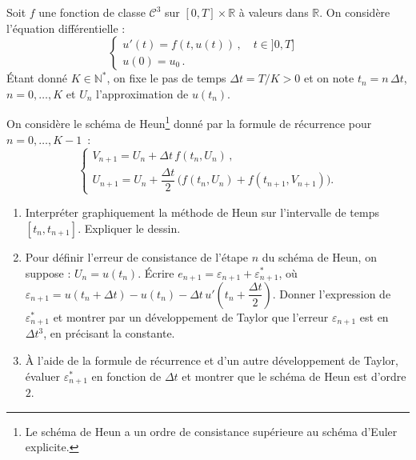 \documentclass[a4paper,12pt,reqno]{amsart}
\begin{document}
\begin{exo}

  Soit $f$ une fonction de classe ${\mathcal{C}}^3$ sur $[0,T] \times \mathbb{R}$ à valeurs dans $\mathbb{R}$. On considère l'équation différentielle :
  \begin{equation}\label{equ1}
    \begin{cases}
      u'(t)=f(t,u(t)) \,, \quad t \in ]0,T] & \\
      u(0)=u_0 \,.
    \end{cases}
  \end{equation}
  Étant donné $K \in \mathbb{N}^*$, on fixe le pas de temps $\Delta t=T/K > 0$ et on note $t_n = n\, \Delta t$, $n = 0, \ldots, K$ et $U_n$  l'approximation de $u(t_n)$.

  On considère le schéma de Heun\footnote{Le schéma de Heun a un ordre de consistance supérieure au schéma d'Euler explicite.} donné par la formule de récurrence pour $n=0,\dots, K-1$~:
  \[
    \begin{cases}
      V_{n+1} = U_n + \Delta t \, f(t_n,U_n) \,, \\
      U_{n+1} = U_n + \dfrac{\Delta t}{2} \, \big( f(t_n,U_n) + f(t_{n+1},V_{n+1}) \big) .
    \end{cases}
  \]
  \begin{enumerate}
    \item Interpréter graphiquement la méthode de Heun sur l'intervalle de temps $[t_n, t_{n+1}]$. Expliquer le dessin.

    \item Pour définir l'erreur de consistance de l'étape $n$ du schéma de Heun, on suppose : $U_n=u(t_n)$. Écrire $e_{n+1} = \varepsilon_{n+1} + \varepsilon_{n+1}^*$, où
    $\varepsilon_{n+1} = u(t_n+\Delta t) -u(t_n) - \Delta t \,u'(t_n + \dfrac{\Delta t}{2})$. Donner l'expression de $\varepsilon_{n+1}^*$ et montrer par un développement de Taylor que l'erreur $\varepsilon_{n+1}$ est en $\Delta t^3$, en précisant la constante.

    \item À l'aide de la formule de récurrence et d'un autre développement de Taylor, évaluer $\varepsilon_{n+1}^*$ en fonction de $\Delta t$ et montrer que le schéma de Heun est d'ordre $2$.

  \end{enumerate}

\end{exo}
\end{document}
